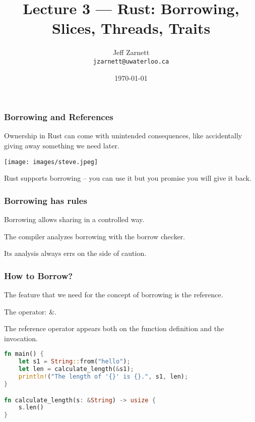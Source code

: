 


\title{Lecture 3 --- Rust: Borrowing, Slices, Threads, Traits  }

\author{Jeff Zarnett \\ \small \texttt{jzarnett@uwaterloo.ca}}
\date{\today}




\begin{frame}
  \titlepage

 \end{frame}
 
 
\begin{frame}
\frametitle{Borrowing and References}

Ownership in Rust can come with unintended consequences, like accidentally giving away something we need later.

\begin{center}
	\texttt{[image: images/steve.jpeg]}
\end{center}

Rust supports \alert{borrowing} -- you can use it but you promise you will give it back.

\end{frame}


\begin{frame}
\frametitle{Borrowing has rules}

Borrowing allows sharing in a controlled way.

The compiler analyzes borrowing with the \alert{borrow checker}. 

Its analysis always errs on the side of caution.


\end{frame}


\begin{frame}[fragile]
\frametitle{How to Borrow?}

The feature that we need for the concept of borrowing is the \alert{reference}.

The operator: \alert{\&}.

The reference operator appears both on the function definition and the invocation.

\begin{lstlisting}[language=Rust]
fn main() {
    let s1 = String::from("hello");
    let len = calculate_length(&s1);
    println!("The length of '{}' is {}.", s1, len);
}

fn calculate_length(s: &String) -> usize {
    s.len()
}
\end{lstlisting}

\end{frame}


